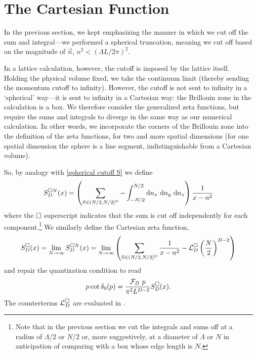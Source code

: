\section{The Cartesian Function}\label{sec:cartesian}

In the previous section, we kept emphasizing the manner in which we cut off the sum and integral---we performed a spherical truncation, meaning we cut off based on the magnitude of $\vec{n}$, $n^2 < (\Lambda L/2\pi)^2$.

In a lattice calculation, however, the cutoff is imposed by the lattice itself.
Holding the physical volume fixed, we take the continuum limit (thereby sending the momentum cutoff to infinity).
However, the cutoff is not sent to infinity in a `spherical' way---it is sent to infinity in a Cartesian way: the Brillouin zone in the calculation is a box.
We therefore consider the generalized zeta functions, but require the sums and integrals to diverge in the same way as our numerical calculation.
In other words, we incorporate the corners of the Brillouin zone into the definition of the zeta functions, for two and more spatial dimensions (for one spatial dimension the sphere is a line segment, indistinguishable from a Cartesian volume).

So, by analogy with \eqref{spherical cutoff S} we define
\begin{equation}
        S^{\cartesian N}_D(x)
        = \left(
            \sum_{\vec{n} \in (N/2, N/2]^D}
            -
            \int_{-N/2}^{N/2} \mathrm{d}n_x\ \mathrm{d}n_y\ \mathrm{d}n_z
        \right) \frac{1}{x-n^2}
\end{equation}
where the $\square$ superscript indicates that the sum is cut off independently for each component.\footnote{Note that in the previous section we cut the integrals and sums off at a radius of $\Lambda/2$ or $N/2$ or, more suggestively, at a diameter of $\Lambda$ or $N$ in anticipation of comparing with a box whose edge length is $N$.}
We similarly define the Cartesian zeta function,
\begin{equation}\label{eq:S cartesian}
    S^{\square}_D(x)
    =
    \lim_{N\rightarrow\infty} S^{\square N}_D(x)
    =
    \lim_{N\rightarrow\infty}\left( \sum_{\vec{n} \in (N/2, N/2]^D} \frac{1}{x-n^2} - \mathcal{L}_D^\square \left(\frac{N}{2}\right)^{D-2}\right)
\end{equation}
and repair the quantization condition to read
\begin{equation}\label{eq:cartesian quantization}
    p \cot \delta_0(p) = \frac{\mathcal{F}_D\ p}{\pi^2 L^{D-2}} S^\square_D(x).
\end{equation}
The counterterms $\mathcal{L}_D^\square$ are evaluated in .

